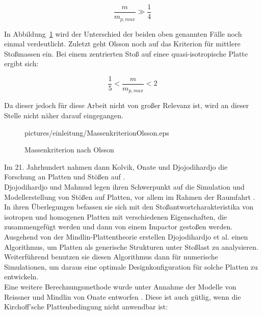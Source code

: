 \begin{equation}
	\frac{m}{m_{p,max}} \gg \frac{1}{4}
\end{equation}

In Abbildung~\ref{fig:Olsson} wird der Unterschied der beiden oben genannten Fälle noch einmal verdeutlicht. Zuletzt geht Olsson noch auf das Kriterion für mittlere Stoßmassen ein. Bei einem zentrierten Stoß auf einee quasi-isotropische Platte ergibt sich:

\begin{equation}
	\frac{1}{5} < \frac{m}{m_{p,max}} < 2
\end{equation}

Da dieser jedoch für diese Arbeit nicht von großer Relevanz ist, wird an dieser Stelle nicht näher darauf eingegangen.\\

\begin{figure}[H]
	\begin{center}
		\begin{overpic}[width=\linewidth]{pictures/einleitung/MassenkriterionOlsson.eps}
					
		\end{overpic}	
		\caption{Massenkriterion nach Olsson}	
		\label{fig:Olsson}
	\end{center}
\end{figure}


Im 21. Jahrhundert nahmen dann Kolvik, Onate und Djojodihardjo die Forschung an Platten und Stößen auf \cite{Kolvik.May2012} \cite{Onate.} \cite{Djojodihardjo.2015}.\\
Djojodihardjo und Mahmud legen ihren Schwerpunkt auf die Simulation und Modellerstellung von Stößen auf Platten, vor allem im Rahmen der Raumfahrt \cite{Djojodihardjo.2015}. In ihren Überlegungen befassen sie sich mit den Stoßantwortcharakteristika von isotropen und homogenen Platten mit verschiedenen Eigenschaften, die zusammengefügt werden und dann von einem Impactor gestoßen werden. Ausgehend von der Mindlin-Plattentheorie erstellen Djojodihardjo et al. einen Algorithmus, um Platten als generische Strukturen unter Stoßlast zu analysieren. Weiterführend benutzen sie diesen Algorithmus dann für numerische Simulationen, um daraus eine optimale Designkonfiguration für solche Platten zu entwickeln.\\
Eine weitere Berechnungsmethode wurde unter Annahme der Modelle von Reissner und Mindlin von Onate entworfen \cite{Onate.}. Diese ist auch gütlig, wenn die Kirchoff'sche Plattenbedingung nicht anwendbar ist:

